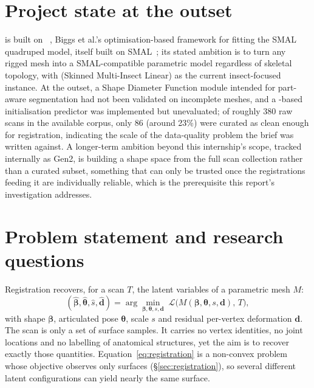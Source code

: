 \section{Project state at the outset}

 is built on ~\cite{smalify}, Biggs et al.'s
optimisation-based framework for fitting the SMAL quadruped model, itself
built on SMAL~\cite{smal}; its stated ambition is to turn any rigged mesh
into a SMAL-compatible parametric model regardless of skeletal topology, with
 (Skinned Multi-Insect Linear) as the current insect-focused
instance. At the outset, a Shape Diameter Function module intended for
part-aware segmentation had not been validated on incomplete meshes, and a
-based initialisation predictor was implemented but
unevaluated; of roughly 380 raw scans in the available corpus, only 86
(around 23\%) were curated as clean enough for registration, indicating the
scale of the data-quality problem the brief was written against. A
longer-term ambition beyond this internship's scope, tracked internally as
 Gen2, is building a shape space from the full scan collection
rather than a curated subset, something that can only be trusted once the
registrations feeding it are individually reliable, which is the
prerequisite this report's investigation addresses.


\section{Problem statement and research questions}
\label{sec:problem}

Registration recovers, for a scan $T$, the latent variables of a parametric
mesh $M$:
\begin{equation}
(\hat{\bm\beta},\hat{\bm\theta},\hat s,\hat{\mathbf d})
 =\arg\min_{\bm\beta,\bm\theta,s,\mathbf d}\;
 \mathcal{L}\big(M(\bm\beta,\bm\theta,s,\mathbf d),\,T\big),
\label{eq:registration}
\end{equation}
with shape $\bm\beta$, articulated pose $\bm\theta$, scale $s$ and residual
per-vertex deformation $\mathbf d$. The scan is only a set of surface
samples. It carries no vertex identities, no joint locations and no
labelling of anatomical structures, yet the aim is to recover exactly those
quantities. Equation~\eqref{eq:registration} is a non-convex problem whose
objective observes only surfaces (\S\ref{sec:registration}), so several
different latent configurations can yield nearly the same surface.

